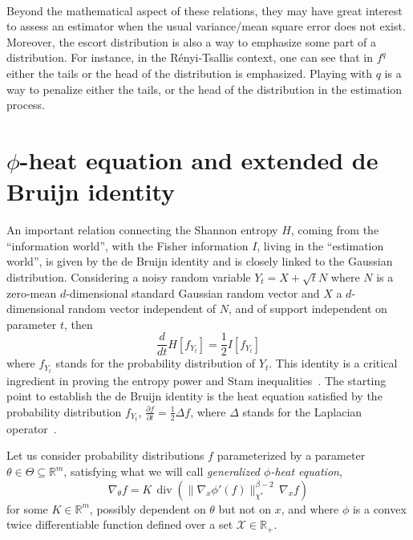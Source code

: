 \documentclass[entropy,article,submit,moreauthors,pdftex]{Definitions/mdpi}
\def\Rset{\mathbb{R}}%
\def\X{\mathcal{X}}%
\def\div{\operatorname{div}}%
\begin{document}
\

Beyond the mathematical aspect of these  relations, they may have great interest
to  assess an  estimator  when the  usual variance/mean  square  error does  not
exist. Moreover, the escort distribution is also  a way to emphasize some part of
a distribution. For  instance, in the R\'enyi-Tsallis context, one  can see that
in $f^q$ either the tails or the head of the distribution is emphasized. Playing
with $q$ is a way to penalize either  the tails, or the head of the distribution
in the estimation process.




\section{$\phi$-heat equation and extended de Bruijn identity}
\label{sec:deBruijn}

An  important relation  connecting  the  Shannon entropy  $H$,  coming from  the
``information  world'',  with   the  Fisher  information  $I$,   living  in  the
``estimation world'', is  given by the de Bruijn identity  and is closely linked
to the  Gaussian distribution. Considering  a noisy random  variable $Y_t =  X +
\sqrt{t} N$  where $N$ is  a zero-mean $d$-dimensional standard  Gaussian random
vector  and $X$  a  $d$-dimensional random  vector independent  of  $N$, and  of
support independent on  parameter $t$, then $$\frac{d}{dt}  H[f_{Y_t}] = \frac12
I[f_{Y_t}]$$ where $f_{Y_t}$  stands for the probability  distribution of $Y_t$.
This identity  is a critical  ingredient in proving  the entropy power  and Stam
inequalities~\cite{CovTho06}.   The starting  point to  establish the  de Bruijn
identity  is  the  heat  equation  satisfied  by  the  probability  distribution
$f_{Y_t}$, $\frac{\partial  f}{\partial t} =  \frac12 \Delta f$,  where $\Delta$
stands for the Laplacian operator~\cite{Wid75}.


Let  us  consider probability  distributions  $f$  parameterized by  a  parameter
$\theta  \in  \Theta \subseteq  \Rset^m$,  satisfying  what  we will  call  {\em
  generalized $\phi$-heat equation},
%
\begin{equation}
\label{eq:phi-heat_equation}
\nabla_\theta f = K \, \div\left( \| \nabla_x \phi'(f) \|_{\chi^*}^{\beta-2}
\, \nabla_x f \right)
\end{equation}
%
for some  $K \in \Rset^m$,  possibly dependent on $\theta$  but not on  $x$, and
where $\phi$  is a convex twice  differentiable function defined over  a set $\X
\in \Rset_+$.
\end{document}
